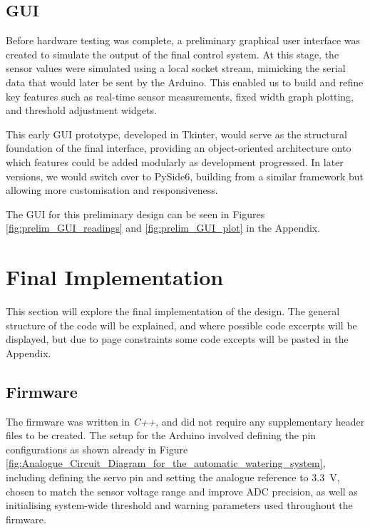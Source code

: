 \documentclass[a4paper,11pt]{article}
\begin{document}
\subsection{GUI}
\label{sec:gui_simulation}

Before hardware testing was complete, a preliminary graphical user interface was created 
to simulate the output of the final control system. 
At this stage, the sensor values were simulated using a local socket stream, mimicking 
the serial data that would later be sent by the Arduino. This enabled us to build and 
refine key features such as real-time sensor measurements,
fixed width graph plotting, and threshold adjustment widgets.

This early GUI prototype, developed in Tkinter, would serve as the structural 
foundation of the final interface, providing an object-oriented architecture 
onto which features could be added modularly as development progressed.
In later versions, we would switch over to PySide6,
building from a similar framework but allowing 
more customisation and responsiveness.

The GUI for this preliminary design can be seen in 
Figures \ref{fig:prelim_GUI_readings} and \ref{fig:prelim_GUI_plot} in the Appendix.

\section{Final Implementation}
\label{sec:final_implementation}

This section will explore the final implementation of the design.
The general structure of the code will be explained, 
and where possible code excerpts will be displayed,
but due to page constraints some code excepts will be pasted in the Appendix.

\subsection{Firmware}
\label{sec:firmware}

The firmware was written in \textit{C++}, and did not require any supplementary 
header files to be created.
The setup for the Arduino involved defining the pin configurations
as shown already in 
Figure \ref{fig:Analogue_Circuit_Diagram_for_the_automatic_watering_system},
including defining the servo pin and 
setting the analogue reference to \SI{3.3}{\volt}, 
chosen to match the sensor voltage range and improve ADC precision, 
as well as initialising system-wide threshold and 
warning parameters used throughout the firmware.
\end{document}
